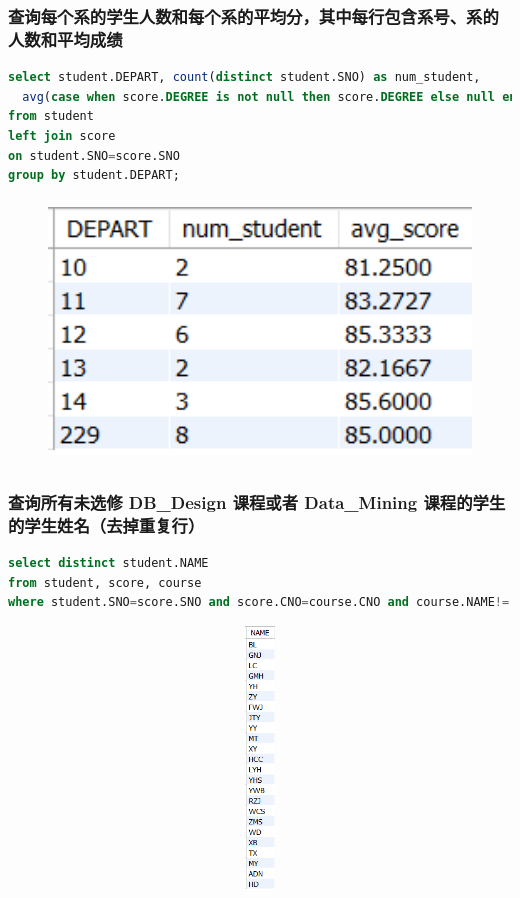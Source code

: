 \documentclass{ctexart}
\begin{document}
\subsubsection{查询每个系的学生人数和每个系的平均分，其中每行包含系号、系的人数和平均成绩}
\begin{lstlisting}[language=sql]
select student.DEPART, count(distinct student.SNO) as num_student,
  avg(case when score.DEGREE is not null then score.DEGREE else null end) as avg_score
from student 
left join score
on student.SNO=score.SNO
group by student.DEPART;

\end{lstlisting}
\begin{figure}[H]
	\centering 
	\includegraphics[height=7cm,width=14cm]{40.png}
	\end{figure}
\subsubsection{查询所有未选修 DB\_Design 课程或者 Data\_Mining 课程的学生的学生姓名（去掉重复行）}
\begin{lstlisting}[language=sql]
select distinct student.NAME
from student, score, course
where student.SNO=score.SNO and score.CNO=course.CNO and course.NAME!='DB_Design' and course.NAME!='Data_Mining';
\end{lstlisting}
\begin{figure}[H]
	\centering 
	\includegraphics[height=7cm,width=14cm]{41.png}
	\end{figure}
\end{document}
